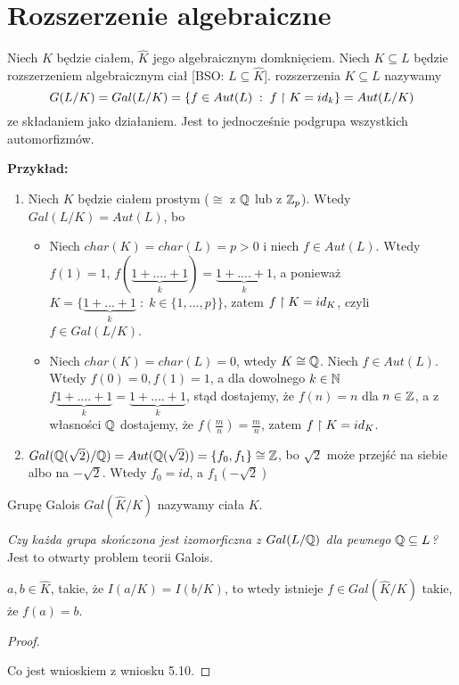 \section{Rozszerzenie algebraiczne}

    Niech $K$ będzie ciałem, $\hat{K}$ jego algebraicznym domknięciem. Niech $K\subseteq L$ będzie rozszerzeniem algebraicznym ciał [BSO: $L\subseteq\hat{K}$].  rozszerzenia $K\subseteq L$ nazywamy 
    $$G(L/K)=Gal(L/K)=\{f\in Aut(L)\;:\;f\upharpoonright K=id_k\}=Aut(L/K)$$
    ze składaniem jako działaniem. Jest to jednocześnie podgrupa wszystkich automorfizmów.

\textbf{Przykład:}

\begin{enumerate}
    \item  Niech $K$ będzie ciałem prostym ($\cong$ z $\mathbb{Q}$ lub z $\mathbb{Z}_p$). Wtedy $Gal(L/K)=Aut(L)$, bo
    \begin{itemize}
        \item [\point] Niech $char(K)=char(L)=p>0$ i niech $f\in Aut(L)$. Wtedy $f(1)=1$, $f(\underbrace{1+....+1}_k)=\underbrace{1+....+1}_k$, a ponieważ $K=\{\underbrace{1+...+1}_k\;:\;k\in\{1,...,p\}\}$, zatem $f\upharpoonright K=id_K$, czyli $f\in Gal(L/K)$.
        \item [\point] Niech $char(K)=char(L)=0$, wtedy $K\cong\mathbb{Q}$. Niech $f\in Aut(L)$. Wtedy $f(0)=0, f(1)=1$, a dla dowolnego $k\in\mathbb{N}$ $f\underbrace{1+....+1}_k=\underbrace{1+....+1}_k$, stąd dostajemy, że $f(n)=n$ dla $n\in\mathbb{Z}$, a z własności $\mathbb{Q}$ dostajemy, że $f(\frac mn)=\frac mn$, zatem $f\upharpoonright K=id_K$.
    \end{itemize}
    \item $Gal(\mathbb{Q}(\sqrt2)/\mathbb{Q})=Aut(\mathbb{Q}(\sqrt2))=\{f_0,f_1\}\cong\mathbb{Z}$, bo $\sqrt{2}$ może przejść na siebie albo na $-\sqrt{2}$. Wtedy $f_0=id$, a $f_1(-\sqrt{2})$ 
\end{enumerate}

    Grupę Galois $Gal(\hat{K}/K)$ nazywamy  ciała $K$.

\emph{Czy każda grupa skończona jest izomorficzna z $Gal(L/\mathbb{Q})$ dla pewnego $\mathbb{Q}\subseteq L$?} Jest to otwarty problem teorii Galois.


\begin{uwaga}
    $a,b\in\hat{K}$, takie, że $I(a/K)=I(b/K)$, to wtedy istnieje $f\in Gal(\hat{K}/K)$ takie, że $f(a)=b$.
\end{uwaga}

\begin{proof}

\begin{center}
\end{center}

Co jest wnioskiem z wniosku 5.10.
\end{proof}

